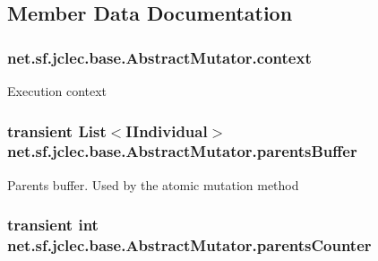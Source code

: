 \subsection{Member Data Documentation}
\hypertarget{classnet_1_1sf_1_1jclec_1_1base_1_1_abstract_mutator_af0995dc3ca644cea60e43aa65085f097}{
\subsubsection[{context}]{ net.\-sf.\-jclec.\-base.\-Abstract\-Mutator.\-context\hspace{0.3cm}{\ttfamily [protected]}}}\label{classnet_1_1sf_1_1jclec_1_1base_1_1_abstract_mutator_af0995dc3ca644cea60e43aa65085f097}
Execution context \hypertarget{classnet_1_1sf_1_1jclec_1_1base_1_1_abstract_mutator_a246b0bbd581762861efb3e2da0e68d3f}{
\subsubsection[{parents\-Buffer}]{\setlength{\rightskip}{0pt plus 5cm}transient List$<${\bf I\-Individual}$>$ net.\-sf.\-jclec.\-base.\-Abstract\-Mutator.\-parents\-Buffer\hspace{0.3cm}{\ttfamily [protected]}}}\label{classnet_1_1sf_1_1jclec_1_1base_1_1_abstract_mutator_a246b0bbd581762861efb3e2da0e68d3f}
Parents buffer. Used by the atomic mutation method \hypertarget{classnet_1_1sf_1_1jclec_1_1base_1_1_abstract_mutator_ad1bc7a6bb4e3be8e6aae039c7bb5d8d8}{
\subsubsection[{parents\-Counter}]{\setlength{\rightskip}{0pt plus 5cm}transient int net.\-sf.\-jclec.\-base.\-Abstract\-Mutator.\-parents\-Counter\hspace{0.3cm}{\ttfamily [protected]}}}\label{classnet_1_1sf_1_1jclec_1_1base_1_1_abstract_mutator_ad1bc7a6bb4e3be8e6aae039c7bb5d8d8}
